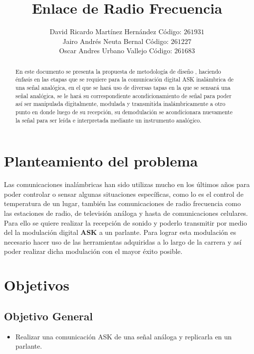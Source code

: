 \documentclass[10pt,graphicx,caption,rotating]{article}
\begin{document}
\title{Enlace de Radio Frecuencia}
\author{David Ricardo Martínez Hernández Código: $261931$\\
	Jairo Andrés Neuta Bernal Código: $261227$\\
	Oscar Andres Urbano Vallejo Código: $261683$}
\date{}
\maketitle

\begin{abstract}
\noindent
En este documento se presenta la propuesta de metodología de diseño ,  haciendo énfasis en las etapas que se requiere para la comunicación digital ASK inalámbrica de una señal analógica, en el que se hará uso de diversas tapas en la que se sensará una señal analógica, se le hará su correspondiente acondicionamiento de señal para poder así ser manipulada digitalmente,  modulada y transmitida inalámbricamente a otro punto en donde luego de su recepción, su demodulación se acondicionara nuevamente la señal para ser leída e interpretada mediante un instrumento analógico. 
\end{abstract}

\section{Planteamiento del problema}
\noindent
Las comunicaciones inalámbricas han sido utilizas mucho en los últimos años para poder controlar o sensar algunas situaciones específicas, como lo es el control de temperatura de un lugar, también las comunicaciones de radio frecuencia como las estaciones de radio, de televisión análoga y hasta de comunicaciones celulares.\\
Para ello se quiere realizar la recepción de sonido y poderlo transmitir por medio del la modulación digital \textbf{ASK} a un parlante. Para lograr esta modulación es necesario hacer uso de las herramientas adquiridas a lo largo de la carrera y así poder realizar dicha modulación con el mayor éxito posible.

\section{Objetivos}
\subsection{Objetivo General}
\begin{itemize}
 \item Realizar una comunicación ASK de una señal análoga y replicarla en un parlante.
\end{itemize}
\end{document}
